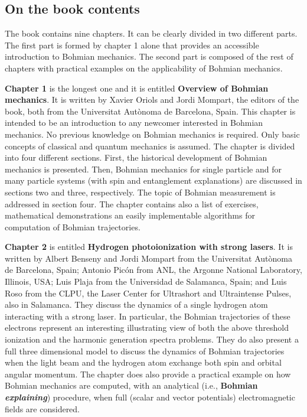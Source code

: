 \documentclass[onecolumn,nofootinbib, secnumarabic, amsmath, nobibnotes,11pt,aps,pra]{revtex4-1}
\begin{document}
\subsection*{On the book contents}

The book contains nine chapters. It can be clearly divided in two different parts. The first part is formed by chapter 1 alone that provides an accessible introduction to Bohmian mechanics. The second part is composed of the rest of chapters with practical examples on the applicability of Bohmian mechanics.

\textbf{Chapter 1} is the longest one and it is entitled \textbf{Overview of Bohmian mechanics}. It is written by Xavier Oriols and Jordi Mompart, the editors of the book, both from the Universitat Aut\`{o}noma de Barcelona, Spain. This chapter is intended to be an introduction to any newcomer interested in Bohmian mechanics. No previous knowledge on Bohmian mechanics is required. Only basic concepts of classical and quantum mechanics is assumed. The chapter is divided into four different sections. First, the historical development of Bohmian mechanics is presented. Then, Bohmian mechanics for single particle and for many particle systems (with spin and entanglement explanations) are discussed in sections two and three, respectively. The topic of Bohmian measurement is addressed in section four. The chapter contains also a list of exercises, mathematical demonstrations an easily implementable algorithms for computation of Bohmian trajectories.

\textbf{Chapter 2} is entitled \textbf{Hydrogen photoionization with strong lasers}. It is written by Albert Benseny and Jordi Mompart from the Universitat Aut\`{o}noma de Barcelona, Spain; Antonio Pic\'on from ANL, the Argonne National Laboratory, Illinois, USA; Luis Plaja from the Universidad de Salamanca, Spain; and Luis Roso from the CLPU, the Laser Center for Ultrashort and Ultraintense Pulses, also in Salamanca.
They discuss the dynamics of a single hydrogen atom interacting with a strong laser. In particular, the Bohmian trajectories of these electrons represent an interesting illustrating view of both the above threshold ionization and the harmonic generation spectra problems. They do also present a full three dimensional model to discuss the dynamics of Bohmian trajectories when the light beam and the hydrogen atom exchange both spin and orbital angular momentum. The chapter does also provide a practical example on how Bohmian mechanics are computed, with an analytical (i.e., \textbf{Bohmian \emph{explaining}}) procedure, when full (scalar and vector potentials) electromagnetic fields are considered.
\end{document}
